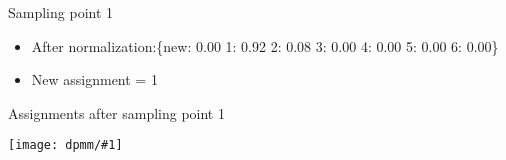 \documentclass[compress]{beamer}
\newcommand{\gfx}[2]{
\begin{center}
	\texttt{[image: dpmm/\#1]}
\end{center}
}
\begin{document}
\begin{frame}{Sampling point 1}
\begin{itemize}
\begin{tiny}
\begin{align}
{p(z_{1} = 4\,|\, \vec{z_{-1}}, \vec{x}, \alpha) & \propto \frac{1.00}{6 + 0.25} \mathcal{N} \left( \begin{array}{c} 8.00 \\ 9.00 \\ \end{array} \, \g \, \begin{array}{c} -2.50 \\ -5.00 \\ \end{array}, \mathbb{1} \right) = 0.16 \times 0.00000\\
p(z_{1} = 5\,|\, \vec{z_{-1}}, \vec{x}, \alpha) & \propto \frac{1.00}{6 + 0.25} \mathcal{N} \left( \begin{array}{c} 8.00 \\ 9.00 \\ \end{array} \, \g \, \begin{array}{c} -3.50 \\ -3.50 \\ \end{array}, \mathbb{1} \right) = 0.16 \times 0.00000\\
p(z_{1} = 6\,|\, \vec{z_{-1}}, \vec{x}, \alpha) & \propto \frac{1.00}{6 + 0.25} \mathcal{N} \left( \begin{array}{c} 8.00 \\ 9.00 \\ \end{array} \, \g \, \begin{array}{c} 0.50 \\ 0.50 \\ \end{array}, \mathbb{1} \right) = 0.16 \times 0.00001}
\end{align}\end{tiny}
\pause
\item<5-> After normalization:\{new: 0.00	1: 0.92	2: 0.08	3: 0.00	4: 0.00
  5: 0.00	6: 0.00\}\pause
\item<6-> New assignment = 1
\end{itemize}
\end{frame}



\begin{frame}{Assignments after sampling point 1}
    \gfx{dpmm2}{.8}
    \end{frame}
\end{document}
